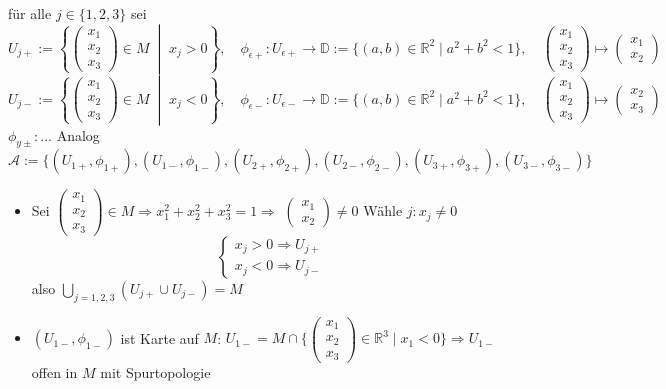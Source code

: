 {für alle $j\in \{1,2,3\}$ sei 
$$
  U_{j+}:=\left\{ \begin{pmatrix} x_1 \\ x_2 \\ x_3 \end{pmatrix} 
  \in M \;\middle|\; x_j > 0 \right\}, \quad \phi_{\epsilon +}:U_{\epsilon +} 
  \to \mathbb{D}:=\{(a,b) \in \mathbb{R}^2 \mid a^2 + b^2 < 1\}, \quad
  \begin{pmatrix} x_1 \\ x_2 \\ x_3 \end{pmatrix} \mapsto 
  \begin{pmatrix} x_1\\ x_2 \end{pmatrix}
$$
$$
  U_{j-}:=\left\{ \begin{pmatrix} x_1 \\ x_2 \\ x_3 \end{pmatrix} 
  \in M \; \middle|\; x_j < 0 \right\},\quad \phi_{\epsilon -}:U_{\epsilon -} \to  
  \mathbb{D}:=\{(a,b) \in \mathbb{R}^2 \mid a^2 + b^2 < 1\}, \quad
  \begin{pmatrix} x_1 \\ x_2 \\ x_3 \end{pmatrix} \mapsto \begin{pmatrix} x_2\\ x_3 \end{pmatrix}
$$
$\phi_{y\pm}:\dots$ Analog\\
$\mathcal{A}:=\{(U_{1+}, \phi_{1+}), (U_{1-}, \phi_{1-}), (U_{2+}, \phi_{2+}), (U_{2-}, \phi_{2-}), (U_{3+}, \phi_{3+}), (U_{3-}, \phi_{3-})\}$
\begin{itemize}
  \item Sei $\begin{pmatrix} x_1 \\ x_2 \\ x_3 \end{pmatrix} \in M \Rightarrow x_1^2 + x_2^2 + x_3^2 = 1 \Rightarrow$
        $\begin{pmatrix} x_1 \\ x_2 \end{pmatrix} \neq 0$
        Wähle $j:x_j \neq 0 $
        $$
        \begin{cases}
          x_j > 0 \Rightarrow U_{j+} \\
          x_j < 0 \Rightarrow U_{j-}
        \end{cases}
    $$
    also $\bigcup_{j=1,2,3} (U_{j+} \cup U_{j-}) = M$
  \item $(U_{1-}, \phi_{1-})$ ist Karte auf $M$:
  $U_{1-}=M\cap \{\begin{pmatrix}
x_1 \\ x_2 \\ x_3 \end{pmatrix} \in \mathbb{R}^3 \mid x_1 < 0\}
  \Rightarrow U_{1-}$ offen in $M$ mit Spurtopologie


\end{itemize}}
